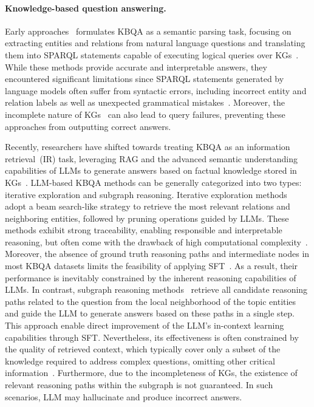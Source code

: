 \paragraph{Knowledge-based question answering.} 
Early approaches~\cite{lan-jiang-2020-query,SPARQL2021,KD-CoT} formulates KBQA as a semantic parsing task, focusing on extracting entities and relations from natural language questions and translating them into SPARQL statements capable of executing logical queries over KGs~\cite{TIARA,SymKGQA}. While these methods provide accurate and interpretable answers, they encountered significant limitations since SPARQL statements generated by language models often suffer from syntactic errors, including incorrect entity and relation labels as well as unexpected grammatical mistakes~\cite{DecAF,RoG,DoG}. Moreover, the incomplete nature of KGs~\cite{KGR3} can also lead to query failures, preventing these approaches from outputting correct answers. 

Recently, researchers have shifted towards treating KBQA as an information retrieval~(IR) task, leveraging RAG and the advanced semantic understanding capabilities of LLMs to generate answers based on factual knowledge stored in KGs~\cite{RRA}. LLM-based KBQA methods can be generally categorized into two types: iterative exploration and subgraph reasoning. Iterative exploration methods~\cite{ToG,ToG2,ToG-I,KG-CoT,PoG,FiDeLiS,GoG,KARPA,Paths-over-Graph,BeamRetrieval,DoG} adopt a beam search-like strategy to retrieve the most relevant relations and neighboring entities, followed by pruning operations guided by LLMs. These methods exhibit strong traceability, enabling responsible and interpretable reasoning, but often come with the drawback of high computational complexity~\cite{FastToG}. Moreover, the absence of ground truth reasoning paths and intermediate nodes in most KBQA datasets limits the feasibility of applying SFT~\cite{RoG,GNN-RAG}. As a result, their performance is inevitably constrained by the inherent reasoning capabilities of LLMs. 
In contrast, subgraph reasoning methods~\cite{RoG,GNN-RAG,SubgraphRAG,READS,GCR} retrieve all candidate reasoning paths related to the question from the local neighborhood of the topic entities and guide the LLM to generate answers based on these paths in a single step. This approach enable direct improvement of the LLM's in-context learning capabilities through SFT. Nevertheless, its effectiveness is often constrained by the quality of retrieved context, which typically cover only a subset of the knowledge required to address complex questions, omitting other critical information~\cite{PoG}. Furthermore, due to the incompleteness of KGs, the existence of relevant reasoning paths within the subgraph is not guaranteed. In such scenarios, LLM may hallucinate and produce incorrect answers.

